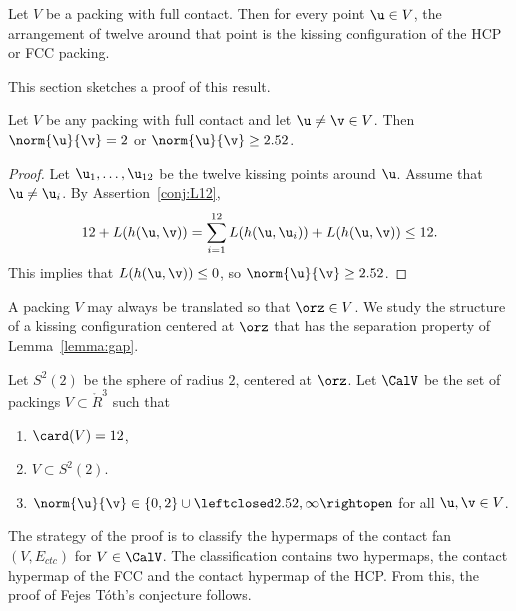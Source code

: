 \begin{theorem}\label{thm:fc} 
  Let $ V$ be a packing with full contact.  Then for every point $
  \u\in V$, the arrangement of twelve around that point is the kissing
  configuration of the HCP or FCC packing.
\end{theorem}
%
%
%

This section  sketches a proof of this result.  


\begin{lemma}[] \label{lemma:gap}
  Let $V$ be any packing with full contact and let $\u\ne\v\in V$.
  Then $\norm{\u}{\v}=2$ or $\norm{\u}{\v} \ge 2.52$.
\end{lemma}
%
%

\begin{proof} Let $ \u_1,\ldots, \u_{12}$ be the twelve kissing points
  around $\u$.  Assume that $\u\ne \u_i$.  By
  Assertion~\ref{conj:L12},
\[
  12 + L(h( \u, \v)) 
  = \sum_{i=1}^{12} L(h( \u, \u_i)) + L(h( \u, \v)) \le 12.
\]
This implies that $L(h( \u, \v))\le 0$, so $\norm{ \u}{ \v}\ge 2.52$.
\end{proof}

A packing $V$ may always be translated so that $\orz\in V$.  We study
the structure of a kissing configuration centered at $\orz$ that
has the separation property of Lemma~\ref{lemma:gap}.

\begin{definition}[$S^2(2)$,~$\CalV$]
  Let $S^2(2)$ be the sphere of radius $2$, centered at $\orz$.  Let
  $\CalV$ be the set of packings $V\subset \ring{R}^3$ such that
\begin{enumerate}\wasitemize 
\item $\card(V) = 12$,
\item $V\subset S^2(2)$.
\item $\norm{\u}{\v} \in \{0,2\}\cup
  \leftclosed2.52,\infty\rightopen$ for all $\u,\v\in V$.
\end{enumerate}\wasitemize 
{}%
%
\end{definition}

The strategy of the proof is to classify the hypermaps of the
contact fan $(V,E_{ctc})$ for $V\in \CalV$.  The classification 
contains two hypermaps, the contact hypermap of the FCC and the contact
hypermap of the HCP.  From this, the proof
of Fejes T\'oth's conjecture  follows.

